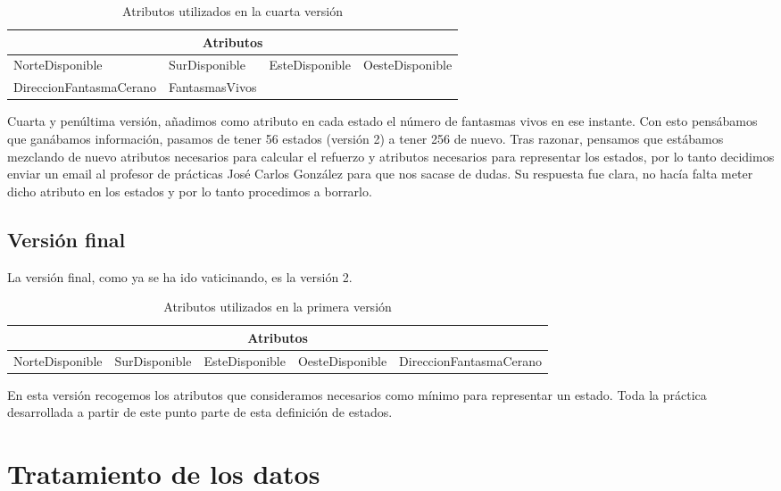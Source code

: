 \documentclass[11pt,a4paper]{article}
\begin{document}
\begin{table}[H]
\centering
\label{AtributosV4}
\begin{tabular}{|l|l|ll}
\hline
\multicolumn{4}{|c|}{\textbf{Atributos}} \\ \hline
NorteDisponible & SurDisponible & \multicolumn{1}{l|}{EsteDisponible} & \multicolumn{1}{l|}{OesteDisponible} \\ \hline
DireccionFantasmaCerano & FantasmasVivos &  &  \\ \cline{1-2}
\end{tabular}
\caption{Atributos utilizados en la cuarta versión}
\end{table}
Cuarta y penúltima versión, añadimos como atributo en cada estado el número de fantasmas vivos en ese instante. Con esto pensábamos que ganábamos información, pasamos de tener 56 estados (versión 2) a tener 256 de nuevo. 
Tras razonar, pensamos que estábamos mezclando de nuevo atributos necesarios para calcular el refuerzo y atributos necesarios para representar los estados, por lo tanto decidimos enviar un email al profesor de prácticas José Carlos González para que nos sacase de dudas. Su respuesta fue clara, no hacía falta meter dicho atributo en los estados y por lo tanto procedimos a borrarlo.

\subsection{Versión final}
La versión final, como ya se ha ido vaticinando, es la versión 2.

\begin{table}[H]
\centering
\label{AtributosVF}
\begin{tabular}{|l|l|l|l|l|}
\hline
\multicolumn{5}{|c|}{\textbf{Atributos}}                                                     \\ \hline
NorteDisponible & SurDisponible & EsteDisponible & OesteDisponible & DireccionFantasmaCerano \\ \hline
\end{tabular}
\caption{Atributos utilizados en la primera versión}
\end{table}

En esta versión recogemos los atributos que consideramos necesarios como mínimo para representar un estado. Toda la práctica desarrollada a partir de este punto parte de esta definición de estados.

\section{Tratamiento de los datos}
\end{document}
